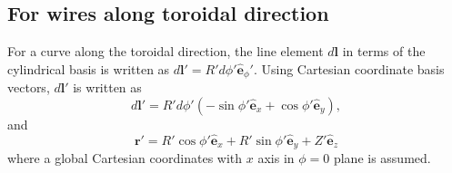 \documentclass{llncs}
\begin{document}
\subsection{For wires along toroidal direction}

For a curve along the toroidal direction, the line element $d\mathbf{l}$ in
terms of the cylindrical basis is written as $d\mathbf{l}' = R' d \phi'
\hat{\mathbf{e}}_{\phi}'$. Using Cartesian coordinate basis vectors,
$d\mathbf{l}'$ is written as
\begin{equation}
  \label{16-12-16-e3} d\mathbf{l}' = R' d \phi' (- \sin \phi'
  \hat{\mathbf{e}}_x + \cos \phi' \hat{\mathbf{e}}_y),
\end{equation}
and
\begin{equation}
  \mathbf{r}' = R' \cos \phi' \hat{\mathbf{e}}_x + R' \sin \phi'
  \hat{\mathbf{e}}_y + Z' \hat{\mathbf{e}}_z
\end{equation}
where a global Cartesian coordinates with $x$ axis in $\phi = 0$ plane is
assumed.
\end{document}

